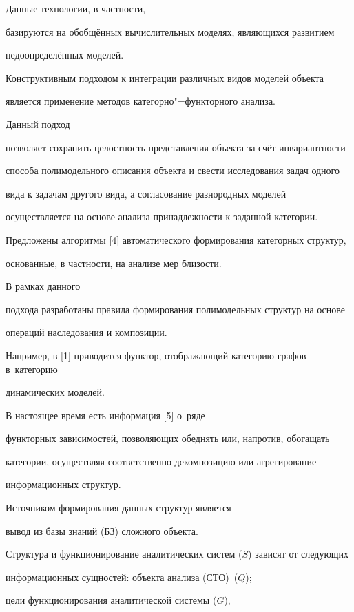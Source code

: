 Данные технологии, в частности,

базируются на обобщённых вычислительных моделях, являющихся развитием

недоопределённых моделей.



Конструктивным подходом к интеграции различных видов моделей объекта

является применение методов категорно"=функторного анализа.

Данный подход

позволяет сохранить целостность представления объекта за счёт инвариантности

способа полимодельного описания объекта и свести исследования задач одного

вида к задачам другого вида, а согласование разнородных моделей

осуществляется на основе анализа принадлежности к заданной категории.

Предложены алгоритмы [4] автоматического формирования категорных структур,

основанные, в частности, на анализе мер близости.

В рамках данного

подхода разработаны правила формирования полимодельных структур на основе

операций наследования и композиции.





Например, в [1] приводится функтор, отображающий категорию графов в~категорию

динамических моделей.

В настоящее время есть информация [5] о~ряде

функторных зависимостей, позволяющих обеднять или, напротив, обогащать

категории, осуществляя соответственно декомпозицию или агрегирование

информационных структур.

Источником формирования данных структур является

вывод из базы знаний (БЗ) сложного объекта.



Структура и функционирование аналитических систем ($S$) зависят от следующих

информационных сущностей: объекта анализа (СТО)~($Q$);

цели функционирования аналитической системы ($G$),

